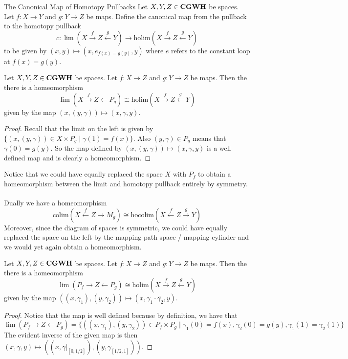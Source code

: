 \documentclass[a4paper]{article}
\begin{document}
\begin{defn}{The Canonical Map of Homotopy Pullbacks}{} Let $X,Y,Z\in\bold{CGWH}$ be spaces. Let $f:X\to Y$ and $g:Y\to Z$ be maps. Define the canonical map from the pullback to the homotopy pullback $$c:\lim(X\overset{f}{\rightarrow}Z\overset{g}{\leftarrow}Y)\to\text{holim}(X\overset{f}{\rightarrow}Z\overset{g}{\leftarrow}Y)$$ to be given by $(x,y)\mapsto(x,e_{f(x)=g(y)},y)$ where $e$ refers to the constant loop at $f(x)=g(y)$. 
\end{defn}

\begin{prp}{}{} Let $X,Y,Z\in\bold{CGWH}$ be spaces. Let $f:X\to Z$ and $g:Y\to Z$ be maps. Then the there is a homeomorphism $$\lim(X\overset{f}{\rightarrow}Z\leftarrow P_g)\cong\text{holim}(X\overset{f}{\rightarrow}Z\overset{g}{\leftarrow}Y)$$ given by the map $(x,(y,\gamma))\mapsto(x,\gamma,y)$. \tcbline
\begin{proof}
Recall that the limit on the left is given by $\{(x,(y,\gamma))\in X\times P_g\;|\;\gamma(1)=f(x)\}$. Also $(y,\gamma)\in P_g$ means that $\gamma(0)=g(y)$. So the map defined by $(x,(y,\gamma))\mapsto(x,\gamma,y)$ is a well defined map and is clearly a homeomorphism. 
\end{proof}
\end{prp}

Notice that we could have equally replaced the space $X$ with $P_f$ to obtain a homeomorphism between the limit and homotopy pullback entirely by symmetry. \\~\\

Dually we have a homeomorphism $$\text{colim}(X\overset{f}{\leftarrow}Z\rightarrow M_g)\cong\text{hocolim}(X\overset{f}{\leftarrow}Z\overset{g}{\rightarrow}Y)$$ Moreover, since the diagram of spaces is symmetric, we could have equally replaced the space on the left by the mapping path space / mapping cylinder and we would yet again obtain a homeomorphism. 

\begin{prp}{}{} Let $X,Y,Z\in\bold{CGWH}$ be spaces. Let $f:X\to Z$ and $g:Y\to Z$ be maps. Then the there is a homeomorphism $$\lim(P_f\rightarrow Z\leftarrow P_g)\cong\text{holim}(X\overset{f}{\rightarrow}Z\overset{g}{\leftarrow}Y)$$ given by the map $((x,\gamma_1),(y,\gamma_2))\mapsto(x,\gamma_1\cdot\overline{\gamma_2},y)$. \tcbline
\begin{proof}
Notice that the map is well defined because by definition, we have that $$\lim(P_f\rightarrow Z\leftarrow P_g)=\{((x,\gamma_1),(y,\gamma_2))\in P_f\times P_g\;|\;\gamma_1(0)=f(x),\gamma_2(0)=g(y),\gamma_1(1)=\gamma_2(1)\}$$ The evident inverse of the given map is then $(x,\gamma,y)\mapsto((x,\gamma|_{[0,1/2]}),(y,\gamma_{[1/2,1]}))$. 
\end{proof}
\end{prp}
\end{document}
